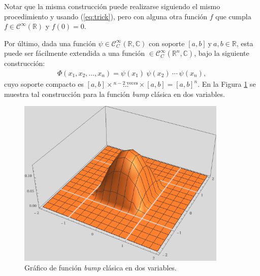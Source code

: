 \documentclass[spanish, fleqn]{article}
\begin{document}
\begin{description}
\begin{enumerate}
	Notar que la misma construcción puede realizarse siguiendo el mismo procedimiento y usando (\ref{eq:trick}), pero con
	alguna otra función $f$ que cumpla $f \in \mathcal{C}^{\infty}(\mathbb{R})$ y $f(0)=0$.

	\end{enumerate}

	Por último, dada una función $\psi \in \mathcal{C}_{C}^{\infty}(\mathbb{R},\mathbb{C})$ con soporte $[a,b] \ \text{y} \ a,b \in \mathbb{R}$, esta puede ser fácilmente extendida a una función $\in \mathcal{C}_{C}^{\infty}(\mathbb{R}^n,\mathbb{C})$, bajo la siguiente construcción:
	\begin{align}
	\Phi(x_1,x_2,\ldots,x_n) = \psi(x_1)\ \psi(x_2)\ \cdots \ \psi(x_n),
	\label{eq:ndbump}
	\end{align}
	cuyo soporte compacto es $[a,b]\times \stackrel{n-2 \text{ veces}}{\ldots} \times [a,b]=[a,b]^n$. En la Figura \ref{fig:3dbump} se muestra tal construcción para la función \textit{bump} clásica en dos variables.
	
	\begin{figure}[htpb!]
	\centering
	\includegraphics[width=10cm]{3dbump}
	\caption{Gráfico de función \textit{bump} clásica en dos variables.}
	\label{fig:3dbump}
	\end{figure}




\end{description}
\end{document}
